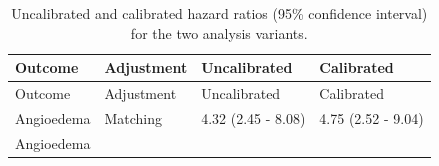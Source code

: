 \documentclass[11pt]{book}
\theoremstyle{definition}
\theoremstyle{definition}
\theoremstyle{definition}
\theoremstyle{remark}
\begin{document}
\begin{longtable}[]{@{}llll@{}}
\caption{\label{tab:sensAnalysis} Uncalibrated and calibrated hazard ratios
(95\% confidence interval) for the two analysis
variants.}\tabularnewline
\toprule
\begin{minipage}[b]{0.27\columnwidth}\raggedright\strut
Outcome\strut
\end{minipage} & \begin{minipage}[b]{0.15\columnwidth}\raggedright\strut
Adjustment\strut
\end{minipage} & \begin{minipage}[b]{0.17\columnwidth}\raggedright\strut
Uncalibrated\strut
\end{minipage} & \begin{minipage}[b]{0.17\columnwidth}\raggedright\strut
Calibrated\strut
\end{minipage}\tabularnewline
\midrule
\endfirsthead
\toprule
\begin{minipage}[b]{0.27\columnwidth}\raggedright\strut
Outcome\strut
\end{minipage} & \begin{minipage}[b]{0.15\columnwidth}\raggedright\strut
Adjustment\strut
\end{minipage} & \begin{minipage}[b]{0.17\columnwidth}\raggedright\strut
Uncalibrated\strut
\end{minipage} & \begin{minipage}[b]{0.17\columnwidth}\raggedright\strut
Calibrated\strut
\end{minipage}\tabularnewline
\midrule
\endhead
\begin{minipage}[t]{0.27\columnwidth}\raggedright\strut
Angioedema\strut
\end{minipage} & \begin{minipage}[t]{0.15\columnwidth}\raggedright\strut
Matching\strut
\end{minipage} & \begin{minipage}[t]{0.17\columnwidth}\raggedright\strut
4.32 (2.45 - 8.08)\strut
\end{minipage} & \begin{minipage}[t]{0.17\columnwidth}\raggedright\strut
4.75 (2.52 - 9.04)\strut
\end{minipage}\tabularnewline
\begin{minipage}[t]{0.27\columnwidth}\raggedright\strut
Angioedema\strut
\end{minipage} & \begin{minipage}[t]{0.15\columnwidth}\raggedright\strut

\end{minipage}
\end{longtable}
\end{document}
